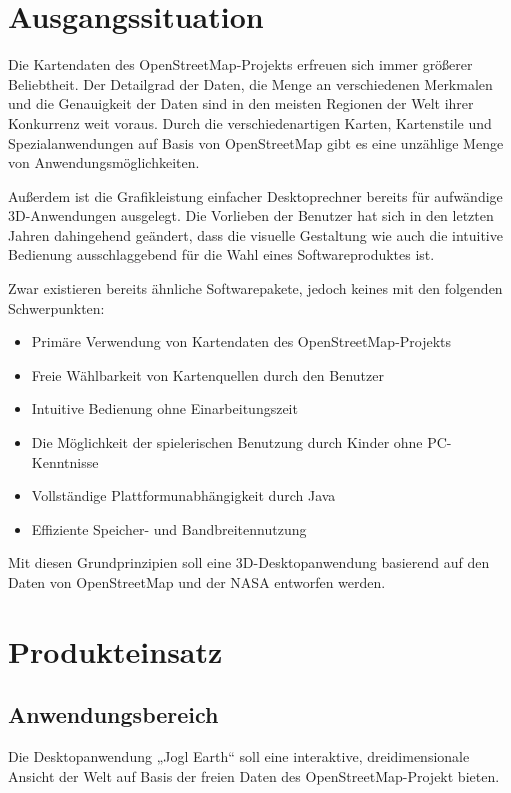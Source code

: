 \documentclass[10pt]{scrreprt}
\begin{document}
\rmfamily
\tableofcontents



\chapter{Ausgangssituation}
Die Kartendaten des OpenStreetMap-Projekts erfreuen sich immer größerer Beliebtheit. Der Detailgrad der Daten, die Menge an verschiedenen Merkmalen und die Genauigkeit der Daten sind in den meisten Regionen der Welt ihrer Konkurrenz weit voraus. Durch die verschiedenartigen Karten, Kartenstile und Spezialanwendungen auf Basis von OpenStreetMap gibt es eine unzählige Menge von Anwendungsmöglichkeiten.

Außerdem ist die Grafikleistung einfacher Desktoprechner bereits für aufwändige 3D-Anwendungen ausgelegt. Die Vorlieben der Benutzer hat sich in den letzten Jahren dahingehend geändert, dass die visuelle Gestaltung wie auch die intuitive Bedienung ausschlaggebend für die Wahl eines Softwareproduktes ist.

\vspace{0.5cm}

Zwar existieren bereits ähnliche Softwarepakete, jedoch keines mit den folgenden Schwerpunkten:
\begin{itemize}
\item Primäre Verwendung von Kartendaten des OpenStreetMap-Projekts
\item Freie Wählbarkeit von Kartenquellen durch den Benutzer
\item Intuitive Bedienung ohne Einarbeitungszeit
\item Die Möglichkeit der spielerischen Benutzung durch Kinder ohne PC-Kenntnisse
\item Vollständige Plattformunabhängigkeit durch Java
\item Effiziente Speicher- und Bandbreitennutzung
\end{itemize}

\vspace{0.5cm}

Mit diesen Grundprinzipien soll eine 3D-Desktopanwendung basierend auf den Daten von OpenStreetMap und der NASA entworfen werden.




\chapter{Produkteinsatz}
\section{Anwendungsbereich}
Die Desktopanwendung „Jogl Earth“ soll eine interaktive, dreidimensionale Ansicht der Welt auf Basis der freien Daten des OpenStreetMap-Projekt bieten. \\
\end{document}
